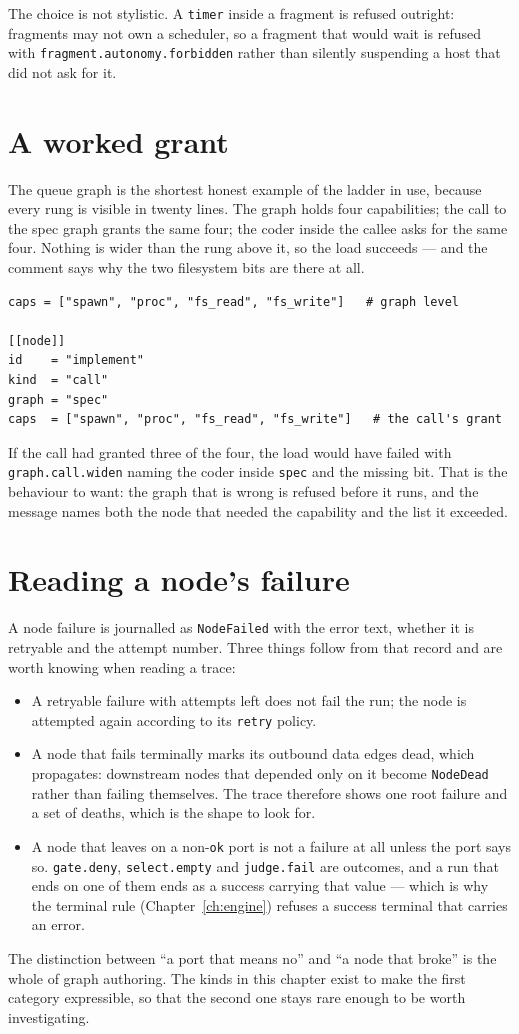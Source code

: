 The choice is not stylistic. A \texttt{timer} inside a fragment is refused outright: fragments may
not own a scheduler, so a fragment that would wait is refused with
\texttt{fragment.autonomy.forbidden} rather than silently suspending a host that did not ask for it.

\section{A worked grant}

The queue graph is the shortest honest example of the ladder in use, because every rung is visible
in twenty lines. The graph holds four capabilities; the call to the spec graph grants the same four;
the coder inside the callee asks for the same four. Nothing is wider than the rung above it, so the
load succeeds --- and the comment says why the two filesystem bits are there at all.

\begin{lstlisting}
caps = ["spawn", "proc", "fs_read", "fs_write"]   # graph level

[[node]]
id    = "implement"
kind  = "call"
graph = "spec"
caps  = ["spawn", "proc", "fs_read", "fs_write"]   # the call's grant
\end{lstlisting}

If the call had granted three of the four, the load would have failed with
\texttt{graph.call.widen} naming the coder inside \texttt{spec} and the missing bit. That is the
behaviour to want: the graph that is wrong is refused before it runs, and the message names both the
node that needed the capability and the list it exceeded.

\section{Reading a node's failure}

A node failure is journalled as \texttt{NodeFailed} with the error text, whether it is retryable and
the attempt number. Three things follow from that record and are worth knowing when reading a trace:

\begin{itemize}
	\item A retryable failure with attempts left does not fail the run; the node is attempted again
	according to its \texttt{retry} policy.
	\item A node that fails terminally marks its outbound data edges dead, which propagates: downstream
	nodes that depended only on it become \texttt{NodeDead} rather than failing themselves. The trace
	therefore shows one root failure and a set of deaths, which is the shape to look for.
	\item A node that leaves on a non-\texttt{ok} port is not a failure at all unless the port says
	so. \texttt{gate.deny}, \texttt{select.empty} and \texttt{judge.fail} are outcomes, and a run that
	ends on one of them ends as a success carrying that value --- which is why the terminal rule
	(Chapter~\ref{ch:engine}) refuses a success terminal that carries an error.
\end{itemize}

The distinction between \enquote{a port that means no} and \enquote{a node that broke} is the whole
of graph authoring. The kinds in this chapter exist to make the first category expressible, so that
the second one stays rare enough to be worth investigating.
